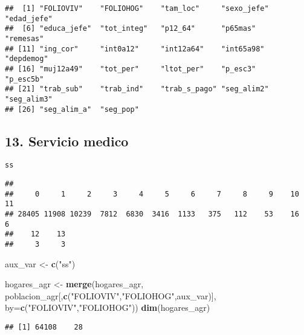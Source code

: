 \documentclass[11pt,]{article}
\newenvironment{Shaded}{\begin{snugshade}}{\end{snugshade}}
\newcommand{\KeywordTok}[1]{\textcolor[rgb]{0.13,0.29,0.53}{\textbf{#1}}}
\newcommand{\DataTypeTok}[1]{\textcolor[rgb]{0.13,0.29,0.53}{#1}}
\newcommand{\StringTok}[1]{\textcolor[rgb]{0.31,0.60,0.02}{#1}}
\newcommand{\CommentTok}[1]{\textcolor[rgb]{0.56,0.35,0.01}{\textit{#1}}}
\newcommand{\OperatorTok}[1]{\textcolor[rgb]{0.81,0.36,0.00}{\textbf{#1}}}
\newcommand{\NormalTok}[1]{#1}
\begin{document}
\begin{verbatim}
##  [1] "FOLIOVIV"    "FOLIOHOG"    "tam_loc"     "sexo_jefe"   "edad_jefe"  
##  [6] "educa_jefe"  "tot_integ"   "p12_64"      "p65mas"      "remesas"    
## [11] "ing_cor"     "int0a12"     "int12a64"    "int65a98"    "depdemog"   
## [16] "muj12a49"    "tot_per"     "ltot_per"    "p_esc3"      "p_esc5b"    
## [21] "trab_sub"    "trab_ind"    "trab_s_pago" "seg_alim2"   "seg_alim3"  
## [26] "seg_alim_a"  "seg_pop"
\end{verbatim}

\subsection{13. Servicio medico}\label{servicio-medico}

\texttt{ss}

\begin{Shaded}
\end{Shaded}

\begin{verbatim}
## 
##     0     1     2     3     4     5     6     7     8     9    10    11 
## 28405 11908 10239  7812  6830  3416  1133   375   112    53    16     6 
##    12    13 
##     3     3
\end{verbatim}

\begin{Shaded}
\begin{Highlighting}[]
\NormalTok{aux_var <-}\StringTok{ }\KeywordTok{c}\NormalTok{(}\StringTok{"ss"}\NormalTok{)}

\NormalTok{hogares_agr <-}\StringTok{ }\KeywordTok{merge}\NormalTok{(hogares_agr,}
\NormalTok{                     poblacion_agr[,}\KeywordTok{c}\NormalTok{(}\StringTok{"FOLIOVIV"}\NormalTok{,}\StringTok{"FOLIOHOG"}\NormalTok{,aux_var)],}
                     \DataTypeTok{by=}\KeywordTok{c}\NormalTok{(}\StringTok{"FOLIOVIV"}\NormalTok{,}\StringTok{"FOLIOHOG"}\NormalTok{))}
\KeywordTok{dim}\NormalTok{(hogares_agr)}
\end{Highlighting}
\end{Shaded}

\begin{verbatim}
## [1] 64108    28
\end{verbatim}
\end{document}
